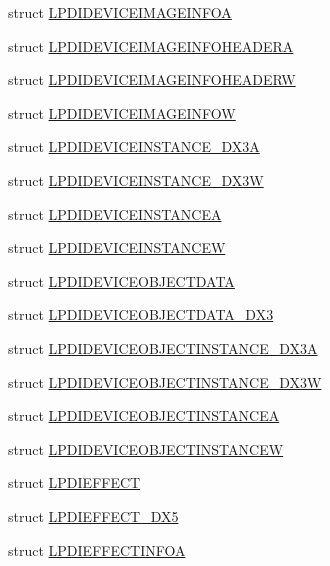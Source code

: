 \begin{DoxyCompactItemize}
\item 
struct \hyperlink{a00003_da/d24/a00068}{L\-P\-D\-I\-D\-E\-V\-I\-C\-E\-I\-M\-A\-G\-E\-I\-N\-F\-O\-A}
\item 
struct \hyperlink{a00003_d4/d31/a00069}{L\-P\-D\-I\-D\-E\-V\-I\-C\-E\-I\-M\-A\-G\-E\-I\-N\-F\-O\-H\-E\-A\-D\-E\-R\-A}
\item 
struct \hyperlink{a00003_d2/db1/a00070}{L\-P\-D\-I\-D\-E\-V\-I\-C\-E\-I\-M\-A\-G\-E\-I\-N\-F\-O\-H\-E\-A\-D\-E\-R\-W}
\item 
struct \hyperlink{a00003_d0/d89/a00071}{L\-P\-D\-I\-D\-E\-V\-I\-C\-E\-I\-M\-A\-G\-E\-I\-N\-F\-O\-W}
\item 
struct \hyperlink{a00003_d6/d2c/a00072}{L\-P\-D\-I\-D\-E\-V\-I\-C\-E\-I\-N\-S\-T\-A\-N\-C\-E\-\_\-\-D\-X3\-A}
\item 
struct \hyperlink{a00003_d1/d6e/a00073}{L\-P\-D\-I\-D\-E\-V\-I\-C\-E\-I\-N\-S\-T\-A\-N\-C\-E\-\_\-\-D\-X3\-W}
\item 
struct \hyperlink{a00003_db/db6/a00074}{L\-P\-D\-I\-D\-E\-V\-I\-C\-E\-I\-N\-S\-T\-A\-N\-C\-E\-A}
\item 
struct \hyperlink{a00003_d9/da5/a00075}{L\-P\-D\-I\-D\-E\-V\-I\-C\-E\-I\-N\-S\-T\-A\-N\-C\-E\-W}
\item 
struct \hyperlink{a00003_db/df8/a00076}{L\-P\-D\-I\-D\-E\-V\-I\-C\-E\-O\-B\-J\-E\-C\-T\-D\-A\-T\-A}
\item 
struct \hyperlink{a00003_d1/d09/a00077}{L\-P\-D\-I\-D\-E\-V\-I\-C\-E\-O\-B\-J\-E\-C\-T\-D\-A\-T\-A\-\_\-\-D\-X3}
\item 
struct \hyperlink{a00003_d9/da4/a00078}{L\-P\-D\-I\-D\-E\-V\-I\-C\-E\-O\-B\-J\-E\-C\-T\-I\-N\-S\-T\-A\-N\-C\-E\-\_\-\-D\-X3\-A}
\item 
struct \hyperlink{a00003_d1/d51/a00079}{L\-P\-D\-I\-D\-E\-V\-I\-C\-E\-O\-B\-J\-E\-C\-T\-I\-N\-S\-T\-A\-N\-C\-E\-\_\-\-D\-X3\-W}
\item 
struct \hyperlink{a00003_da/dec/a00080}{L\-P\-D\-I\-D\-E\-V\-I\-C\-E\-O\-B\-J\-E\-C\-T\-I\-N\-S\-T\-A\-N\-C\-E\-A}
\item 
struct \hyperlink{a00003_d8/d53/a00081}{L\-P\-D\-I\-D\-E\-V\-I\-C\-E\-O\-B\-J\-E\-C\-T\-I\-N\-S\-T\-A\-N\-C\-E\-W}
\item 
struct \hyperlink{a00003_d4/d63/a00082}{L\-P\-D\-I\-E\-F\-F\-E\-C\-T}
\item 
struct \hyperlink{a00003_d2/d1f/a00083}{L\-P\-D\-I\-E\-F\-F\-E\-C\-T\-\_\-\-D\-X5}
\item 
struct \hyperlink{a00003_df/d5d/a00084}{L\-P\-D\-I\-E\-F\-F\-E\-C\-T\-I\-N\-F\-O\-A}
\item 

\end{DoxyCompactItemize}
